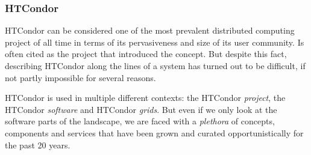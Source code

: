 \documentclass{sig-alternate}
\begin{document}



%
\subsubsection{HTCondor}

HTCondor can be considered one of the most prevalent distributed computing
project of all time in terms of its pervasiveness and size of its  user
community.
Is often cited as the project that introduced the \pilotjob concept.
But despite this fact, describing HTCondor along the lines of a \pilotjob
system has turned out to be difficult, if not partly impossible for several
reasons.

HTCondor is used in multiple different contexts: the HTCondor \textit{project},
the HTCondor \textit{software} and HTCondor \textit{grids}. But even if we only
look at the software parts of the landscape, we are faced with a
\textit{plethora} of concepts, components and services that have been grown and
curated opportunistically for the past 20 years.

%
\end{document}
